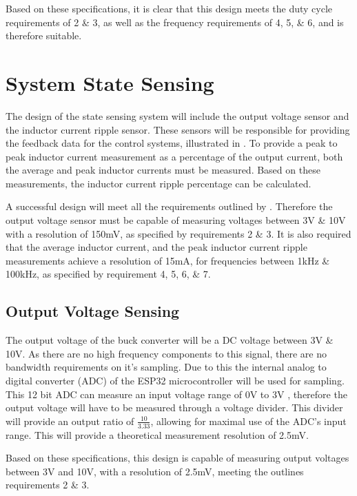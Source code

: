 Based on these specifications, it is clear that this design meets the duty cycle requirements of 2 \& 3, as well as the frequency requirements of 4, 5, \& 6, and is therefore suitable.
 

%
%

\section{System State Sensing}\label{S:sensing_design}

The design of the state sensing system will include the output voltage sensor and the inductor current ripple sensor. These sensors will be responsible for providing the feedback data for the control systems, illustrated in . To provide a peak to peak inductor current measurement as a percentage of the output current, both the average and peak inductor currents must be measured. Based on these measurements, the inductor current ripple percentage can be calculated.

A successful design will meet all the requirements outlined by . Therefore the output voltage sensor must be capable of measuring voltages between 3V \& 10V with a resolution of 150mV, as specified by requirements 2 \& 3. It is also required that the average inductor current, and the peak inductor current ripple measurements achieve a resolution of 15mA, for frequencies between 1kHz \& 100kHz, as specified by requirement 4, 5, 6, \& 7.


\subsection{Output Voltage Sensing}\label{S:v_sense_design}

The output voltage of the buck converter will be a DC voltage between 3V \& 10V. As there are no high frequency components to this signal, there are no bandwidth requirements on it's sampling. Due to this the internal analog to digital converter (ADC) of the ESP32 microcontroller will be used for sampling. This 12 bit ADC can measure an input voltage range of 0V to 3V \cite{ESP32Manual}, therefore the output voltage will have to be measured through a voltage divider. This divider will provide an output ratio of $\frac{10}{3.33}$, allowing for maximal use of the ADC's input range. This will provide a theoretical measurement resolution of 2.5mV. 

Based on these specifications, this design is capable of measuring output voltages between 3V and 10V, with a resolution of 2.5mV, meeting the outlines requirements 2 \& 3.


